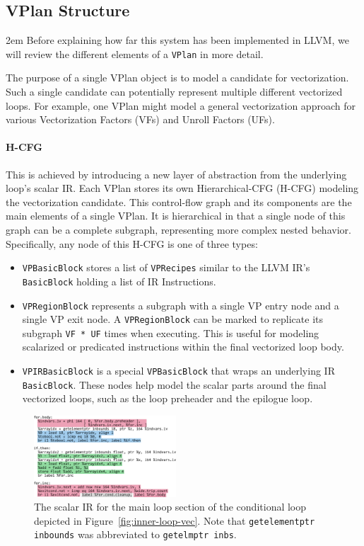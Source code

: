 \documentclass[sigplan,11pt,nonacm]{acmart}
\begin{document}
\subsection{VPlan Structure}
\emergencystretch 2em
Before explaining how far this system has been implemented in LLVM, we will review
the different elements of a \texttt{VPlan} in more detail.

The purpose of a single VPlan object is to model a candidate for vectorization. 
Such a single candidate can potentially represent multiple different vectorized loops. 
For example, one VPlan might model a general vectorization approach for various 
Vectorization Factors (VFs) and Unroll Factors (UFs).

\paragraph{H-CFG}
This is achieved by introducing a new layer of abstraction from the underlying loop's scalar IR.
Each VPlan stores its own Hierarchical-CFG (H-CFG) modeling the vectorization candidate. This 
control-flow graph and its components are the main elements of a single VPlan. It is hierarchical
in that a single node of this graph can be a complete subgraph, representing more complex nested
behavior.
Specifically, any node of this H-CFG is one of three types:

\begin{itemize}
  \item \texttt{VPBasicBlock} stores a list of \texttt{VPRecipes} similar to 
  the LLVM IR's \texttt{BasicBlock} holding a list of IR Instructions.
  \item \texttt{VPRegionBlock} represents a subgraph with a single VP entry node and a 
  single VP exit node. A \texttt{VPRegionBlock} can be marked to replicate its subgraph
  \texttt{VF * UF} times when executing. This is useful for modeling scalarized or predicated
  instructions within the final vectorized loop body.
  \item \texttt{VPIRBasicBlock} is a special \texttt{VPBasicBlock} that wraps an underlying
  IR \texttt{BasicBlock}. These nodes help model the scalar parts around the 
  final vectorized loops, such as the loop preheader and the epilogue loop.
\end{itemize}

\begin{figure}
  \centering
  \includegraphics[width=0.475\textwidth]{images/inner-loop-scalar-loop-ir-color.png}
  \caption{The scalar IR for the main loop section of the conditional loop depicted in
  Figure~\ref{fig:inner-loop-vec}. Note that \texttt{getelementptr inbounds}
  was abbreviated to \texttt{getelmptr inbs}.}
  \label{fig:inner-loop-scalar-ir}
\end{figure}
\end{document}
